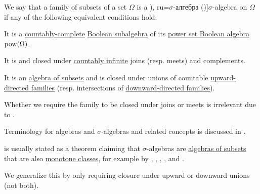 \begin{definition}\label{def:sigma_algebra}
  We say that a family of subsets of a set \( \Omega \) is a \term[bg=\( \sigma \)-алгебра (\cite[def. 3.3]{Драганов2022Мерки}), ru=\( \sigma \)-алгебра (\cite[def. II.1.4]{Ширяев2007ВероятностиТом1})]{\( \sigma \)-algebra} on \( \Omega \) if any of the following equivalent conditions hold:
  \begin{thmenum}
    \mimprovised It is a \hyperref[def:countably_complete_lattice]{countably-complete} \hyperref[def:boolean_algebra/submodel]{Boolean subalgebra} of its \hyperref[thm:boolean_algebra_of_subsets]{power set Boolean algebra} \( \operatorname{pow}(\Omega) \).

     It is  and closed under \hyperref[def:set_countability/countably_infinite]{countably infinite} joins (resp. meets) and complements.

     It is an \hyperref[def:algebra_of_subsets]{algebra of subsets} and is closed under unions of countable \hyperref[def:directed_set]{upward-directed families} (resp. intersections of \hyperref[def:directed_set]{downward-directed families}).
  \end{thmenum}
\end{definition}
\begin{comments}
  \item Whether we require the family to be closed under joins or meets is irrelevant due to .

  \item Terminology for algebras and \( \sigma \)-algebras and related concepts is discussed in .
  \item {} is usually stated as a theorem claiming that \( \sigma \)-algebras are \hyperref[def:algebra_of_subsets]{algebras of subsets} that are also \hyperref[def:monotone_class]{monotone classes}, for example by
  ,
  ,
  ,
  ,
   and
  .

  We generalize this by only requiring closure under upward or downward unions (not both).
\end{comments}
